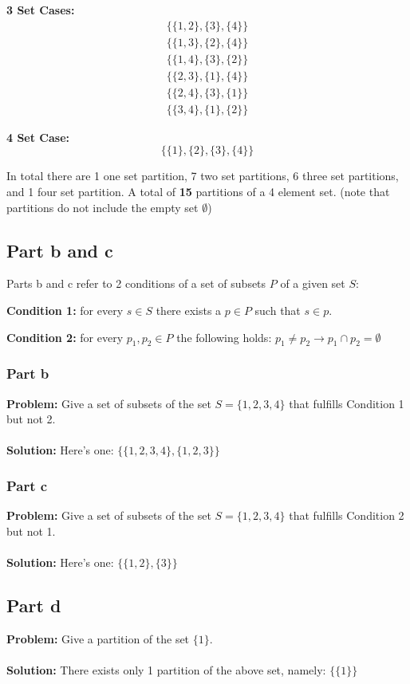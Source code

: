 \documentclass{article}
\begin{document}
\textbf{3 Set Cases:}
\begin{gather*}
\{\{1,2\},\{3\},\{4\}\}\\
\{\{1,3\},\{2\},\{4\}\}\\
\{\{1,4\},\{3\},\{2\}\}\\
\{\{2,3\},\{1\},\{4\}\}\\
\{\{2,4\},\{3\},\{1\}\}\\
\{\{3,4\},\{1\},\{2\}\}
\end{gather*}

\textbf{4 Set Case:}
$$\{\{1\},\{2\},\{3\},\{4\}\}$$

In total there are 1 one set partition, 7 two set partitions, $6$ three set partitions, and 1 four set partition. A total of \textbf{15} partitions of a 4 element set. (note that partitions do not include the empty set $\emptyset$)

\subsection{Part b and c}
Parts b and c refer to 2 conditions of a set of subsets $P$ of a given set $S$:

\textbf{Condition 1:} for every $s\in S$ there exists a $p\in P$ such that $s\in p$.

\textbf{Condition 2:} for every $p_1,p_2\in P$ the following holds: $p_1\not=p_2\rightarrow p_1\cap p_2=\emptyset$

\subsubsection{Part b}
\textbf{Problem:} Give a set of subsets of the set $S=\{1,2,3,4\}$ that fulfills Condition 1 but not 2.
\\\\
\textbf{Solution:} Here's one: $\{\{1,2,3,4\},\{1,2,3\}\}$

\subsubsection{Part c}
\textbf{Problem:} Give a set of subsets of the set $S=\{1,2,3,4\}$ that fulfills Condition 2 but not 1.
\\\\
\textbf{Solution:} Here's one: $\{\{1,2\},\{3\}\}$

\subsection{Part d}
\textbf{Problem:} Give a partition of the set $\{1\}$.
\\\\
\textbf{Solution:} There exists only 1 partition of the above set, namely: $\{\{1\}\}$
\end{document}
